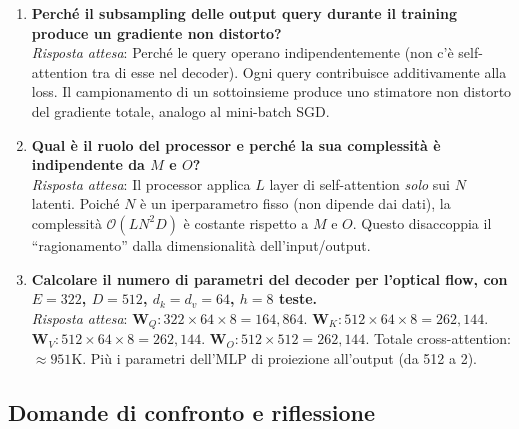 \documentclass[12pt,a4paper]{article}
\begin{document}
\begin{enumerate}[label=\textbf{Q\arabic*.}, resume]
    \item \textbf{Perch\'e il subsampling delle output query durante il training produce un gradiente non distorto?}\\
    \textit{Risposta attesa}: Perch\'e le query operano indipendentemente (non c'\`e self-attention tra di esse nel decoder). Ogni query contribuisce additivamente alla loss. Il campionamento di un sottoinsieme produce uno stimatore non distorto del gradiente totale, analogo al mini-batch SGD.

    \item \textbf{Qual \`e il ruolo del processor e perch\'e la sua complessit\`a \`e indipendente da $M$ e $O$?}\\
    \textit{Risposta attesa}: Il processor applica $L$ layer di self-attention \emph{solo} sui $N$ latenti. Poich\'e $N$ \`e un iperparametro fisso (non dipende dai dati), la complessit\`a $\mathcal{O}(LN^2D)$ \`e costante rispetto a $M$ e $O$. Questo disaccoppia il ``ragionamento'' dalla dimensionalit\`a dell'input/output.

    \item \textbf{Calcolare il numero di parametri del decoder per l'optical flow, con $E = 322$, $D = 512$, $d_k = d_v = 64$, $h = 8$ teste.}\\
    \textit{Risposta attesa}: $\mathbf{W}_Q: 322 \times 64 \times 8 = 164{,}864$. $\mathbf{W}_K: 512 \times 64 \times 8 = 262{,}144$. $\mathbf{W}_V: 512 \times 64 \times 8 = 262{,}144$. $\mathbf{W}_O: 512 \times 512 = 262{,}144$. Totale cross-attention: $\approx 951$K. Pi\`u i parametri dell'MLP di proiezione all'output (da 512 a 2).
\end{enumerate}

\subsection{Domande di confronto e riflessione}
\end{document}
